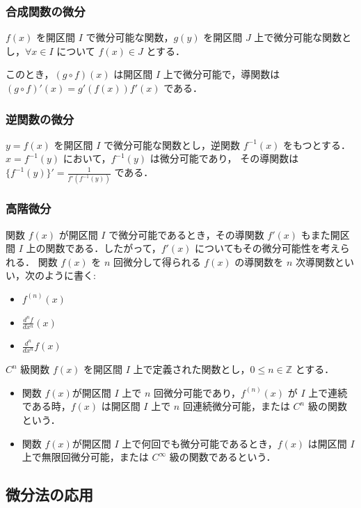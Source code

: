 \documentclass[xelatex,ja=standard,jafont=noto]{bxjsarticle}
\begin{document}
  \subsubsection{合成関数の微分}
  \begin{theorem}{}{}
    $f(x)$ を開区間 $I$ で微分可能な関数，$g(y)$ を開区間 $J$ 上で微分可能な関数とし，$\forall x \in I$ について $f(x) \in J$ とする．
    
    このとき，$(g \circ f)(x)$ は開区間 $I$ 上で微分可能で，導関数は $(g \circ f)'(x) = g'(f(x))f'(x)$  である．
  \end{theorem}
  \subsubsection{逆関数の微分}
  \begin{theorem}{}{}
    $y = f(x)$ を開区間 $I$ で微分可能な関数とし，逆関数 $f^{-1}(x)$ をもつとする． $x = f^{-1}(y)$ において，$f^{-1}(y)$ は微分可能であり，
    その導関数は $\{f^{-1}(y)\}' = \frac{1}{f'(f^{-1}(y))}$ である．
  \end{theorem}
  \subsubsection{高階微分}
  \begin{tcb}
    関数 $f(x)$ が開区間 $I$ で微分可能であるとき，その導関数 $f'(x)$ もまた開区間 $I$ 上の関数である．したがって，$f'(x)$ についてもその微分可能性を考えられる．
    関数 $f(x)$ を $n$ 回微分して得られる $f(x)$ の導関数を $n$ 次導関数といい，次のように書く: 
    \begin{itemize}
      \item $f^{(n)}(x)$ 
      \item $\frac{d^n f}{d x^n}(x)$
      \item $\frac{d^n}{d x^n}f(x)$
    \end{itemize}  
  \end{tcb}
  
  \begin{tcb}{$C^n$ 級関数}{}
    $f(x)$ を開区間 $I$ 上で定義された関数とし，$0 \leq n \in \mathbb{Z}$ とする．
    \begin{itemize}
      \item 関数 $f(x)$が開区間 $I$ 上で $n$ 回微分可能であり，$f^{(n)}(x)$ が $I$ 上で連続である時，$f(x)$ は開区間 $I$ 上で $n$ 回連続微分可能，または $C^n$ 級の関数という．
      \item 関数 $f(x)$が開区間 $I$ 上で何回でも微分可能であるとき，$f(x)$ は開区間 $I$ 上で無限回微分可能，または $C^{\infty}$ 級の関数であるという．
    \end{itemize}
  \end{tcb}
  
  \subsection{微分法の応用}
\end{document}
